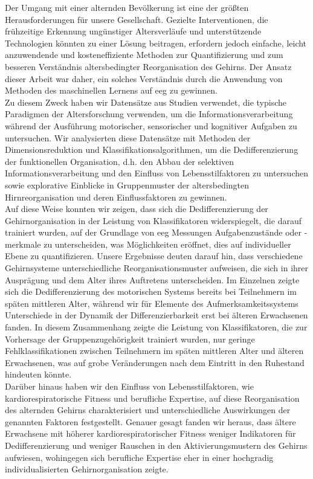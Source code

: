 Der Umgang mit einer alternden Bevölkerung ist eine der größten Herausforderungen für unsere Gesellschaft. Gezielte Interventionen, die frühzeitige Erkennung ungünstiger Altersverläufe und unterstützende Technologien könnten zu einer Lösung beitragen, erfordern jedoch einfache, leicht anzuwendende und kosteneffiziente Methoden zur Quantifizierung und zum besseren Verständnis altersbedingter Reorganisation des Gehirns. Der Ansatz dieser Arbeit war daher, ein solches Verständnis durch die Anwendung von Methoden des maschinellen Lernens auf \gls{eeg} zu gewinnen.\\
Zu diesem Zweck haben wir Datensätze aus Studien verwendet, die typische Paradigmen der Altersforschung verwenden, um die Informationsverarbeitung während der Ausführung motorischer, sensorischer und kognitiver Aufgaben zu untersuchen. Wir analysierten diese Datensätze mit Methoden der Dimensionsreduktion und Klassifikationsalgorithmen, um die Dedifferenzierung der funktionellen Organisation, d.h. den Abbau der selektiven Informationsverarbeitung und den Einfluss von Lebensstilfaktoren zu untersuchen sowie explorative Einblicke in Gruppenmuster der altersbedingten Hirnreorganisation und deren Einflussfaktoren zu gewinnen.\\
Auf diese Weise konnten wir zeigen, dass sich die Dedifferenzierung der Gehirnorganisation in der Leistung von Klassifikatoren widerspiegelt, die darauf trainiert wurden, auf der Grundlage von \gls{eeg} Messungen Aufgabenzustände oder -merkmale zu unterscheiden, was Möglichkeiten eröffnet, dies auf individueller Ebene zu quantifizieren. Unsere Ergebnisse deuten darauf hin, dass verschiedene Gehirnsysteme unterschiedliche Reorganisationsmuster aufweisen, die sich in ihrer Ausprägung und dem Alter ihres Auftretens unterscheiden. Im Einzelnen zeigte sich die Dedifferenzierung des motorischen Systems bereits bei Teilnehmern im späten mittleren Alter, während wir für Elemente des Aufmerksamkeitssystems Unterschiede in der Dynamik der Differenzierbarkeit erst bei älteren Erwachsenen fanden. In diesem Zusammenhang zeigte die Leistung von Klassifikatoren, die zur Vorhersage der Gruppenzugehörigkeit trainiert wurden, nur geringe Fehlklassifikationen zwischen Teilnehmern im späten mittleren Alter und älteren Erwachsenen, was auf grobe Veränderungen nach dem Eintritt in den Ruhestand hindeuten könnte.\\
Darüber hinaus haben wir den Einfluss von Lebensstilfaktoren, wie kardiorespiratorische Fitness und berufliche Expertise, auf diese Reorganisation des alternden Gehirns charakterisiert und unterschiedliche Auswirkungen der genannten Faktoren festgestellt. Genauer gesagt fanden wir heraus, dass ältere Erwachsene mit höherer kardiorespiratorischer Fitness weniger Indikatoren für Dedifferenzierung und weniger Rauschen in den Aktivierungsmustern des Gehirns aufwiesen, wohingegen sich berufliche Expertise eher in einer hochgradig individualisierten Gehirnorganisation zeigte.\\
